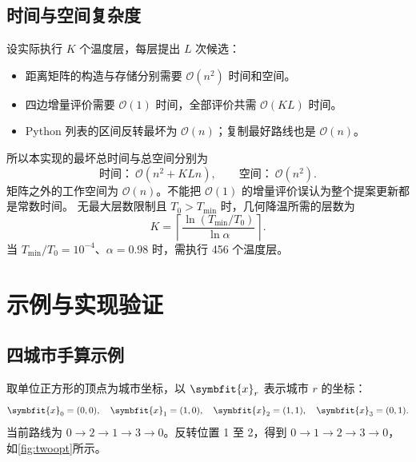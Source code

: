 \documentclass[UTF8,a4paper,11pt,fontset=none]{ctexart}
\numberwithin{equation}{section}
\newcommand{\bigO}{\mathcal{O}}
\begin{document}
\subsection{时间与空间复杂度}
设实际执行 $K$ 个温度层，每层提出 $L$ 次候选：
\begin{itemize}
  \item 距离矩阵的构造与存储分别需要 $\bigO(n^2)$ 时间和空间。
  \item 四边增量评价需要 $\bigO(1)$ 时间，全部评价共需 $\bigO(KL)$ 时间。
  \item Python 列表的区间反转最坏为 $\bigO(n)$；复制最好路线也是 $\bigO(n)$。
\end{itemize}
所以本实现的最坏总时间与总空间分别为
\begin{equation}
  \boxed{\text{时间：}\ \bigO(n^2+KLn),\qquad
  \text{空间：}\ \bigO(n^2).}
\end{equation}
矩阵之外的工作空间为 $\bigO(n)$。不能把 $\bigO(1)$ 的增量评价误认为整个提案更新都是常数时间。
无最大层数限制且 $T_0>T_{\min}$ 时，几何降温所需的层数为
\begin{equation}
  K=\left\lceil\frac{\ln(T_{\min}/T_0)}{\ln\alpha}\right\rceil.
\end{equation}
当 $T_{\min}/T_0=10^{-4}$、$\alpha=0.98$ 时，需执行 456 个温度层。

\section{示例与实现验证}
\subsection{四城市手算示例}
取单位正方形的顶点为城市坐标，以 $\symbfit{x}_r$ 表示城市 $r$ 的坐标：
\begin{equation*}
  \symbfit{x}_0=(0,0),\quad \symbfit{x}_1=(1,0),\quad
  \symbfit{x}_2=(1,1),\quad \symbfit{x}_3=(0,1).
\end{equation*}
当前路线为 $0\to2\to1\to3\to0$。反转位置 1 至 2，得到
$0\to1\to2\to3\to0$，如\cref{fig:twoopt}所示。
\end{document}
